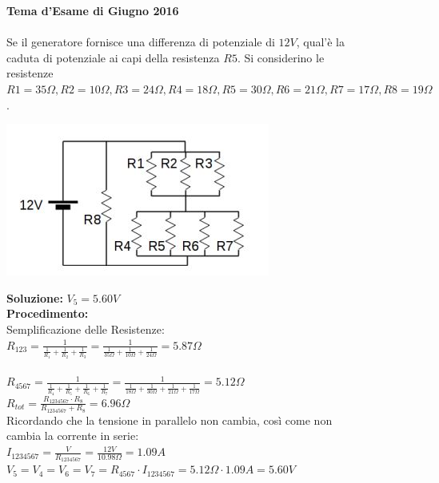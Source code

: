 \begin{figure}[h!]
\textbf{Tema d'Esame di Giugno 2016}\\ \\
Se il generatore fornisce una differenza di potenziale di $12 V$, qual'è la caduta di potenziale ai capi della resistenza $R5$. Si considerino le resistenze 
$R1= 35 \Omega, R2= 10 \Omega, R3= 24 \Omega, R4= 18 \Omega, R5= 30 \Omega, R6= 21 \Omega, R7=17 \Omega , R8=19 \Omega$.
	\begin{center}
		\includegraphics[scale=1]{ES5/GIU052016.jpg}
	\end{center}
	\begin{boxed}
		\null\hfill \textbf{Soluzione:} $V_5 = 5.60 V$\\
		\textbf{Procedimento: } \\
		Semplificazione delle Resistenze:\\
		$R_{123}=\frac{1}{\frac{1}{R_1}+\frac{1}{R_2}+\frac{1}{R_3}}=\frac{1}{\frac{1}{35\Omega}+\frac{1}{10\Omega}+\frac{1}{24\Omega}}=5.87\Omega$\\ \\ 
		$R_{4567}=\frac{1}{\frac{1}{R_4}+\frac{1}{R_5}+\frac{1}{R_6}+\frac{1}{R_7}}=\frac{1}{\frac{1}{18\Omega}+\frac{1}{30\Omega}+\frac{1}{21\Omega}+\frac{1}{17\Omega}}=5.12\Omega$\\
		$R_{tot}=\frac{R_{1234567}\cdot R_8}{R_{1234567}+ R_8}=6.96\Omega$\\
		Ricordando che la tensione in parallelo non cambia, così come non cambia la corrente in serie:\\
		$I_{1234567}=\frac{V}{R_{1234567}}=\frac{12V}{10.98\Omega}=1.09A$\\
		$V_5=V_4=V_6=V_7=R_{4567}\cdot I_{1234567}=5.12\Omega\cdot 1.09A=5.60V$
	\end{boxed}
\end{figure}

